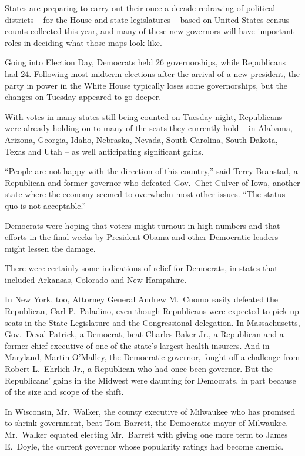 ﻿\documentclass[12pt]{article}
\begin{document}
States are preparing to carry out their once-a-decade redrawing of political districts -- for the
House and state legislatures -- based on United States census counts collected this year, and many
of these new governors will have important roles in deciding what those maps look like.

Going into Election Day, Democrats held 26 governorships, while Republicans had 24. Following most
midterm elections after the arrival of a new president, the party in power in the White House
typically loses some governorships, but the changes on Tuesday appeared to go deeper.

With votes in many states still being counted on Tuesday night, Republicans were already holding on
to many of the seats they currently hold -- in Alabama, Arizona, Georgia, Idaho, Nebraska, Nevada,
South Carolina, South Dakota, Texas and Utah -- as well anticipating significant gains.

``People are not happy with the direction of this country,'' said Terry Branstad, a Republican and
former governor who defeated Gov.~Chet Culver of Iowa, another state where the economy seemed to
overwhelm most other issues. ``The status quo is not acceptable.''

Democrats were hoping that voters might turnout in high numbers and that efforts in the final weeks
by President Obama and other Democratic leaders might lessen the damage.

There were certainly some indications of relief for Democrats, in states that included Arkansas,
Colorado and New Hampshire.

In New York, too, Attorney General Andrew M.~Cuomo easily defeated the Republican, Carl P.~Paladino,
even though Republicans were expected to pick up seats in the State Legislature and the
Congressional delegation. In Massachusetts, Gov.~Deval Patrick, a Democrat, beat Charles Baker Jr.,
a Republican and a former chief executive of one of the state's largest health insurers. And in
Maryland, Martin O'Malley, the Democratic governor, fought off a challenge from Robert L.~Ehrlich
Jr., a Republican who had once been governor. But the Republicans' gains in the Midwest were
daunting for Democrats, in part because of the size and scope of the shift.

In Wisconsin, Mr.~Walker, the county executive of Milwaukee who has promised to shrink government,
beat Tom Barrett, the Democratic mayor of Milwaukee. Mr.~Walker equated electing Mr.~Barrett with
giving one more term to James E.~Doyle, the current governor whose popularity ratings had become
anemic.
\end{document}
